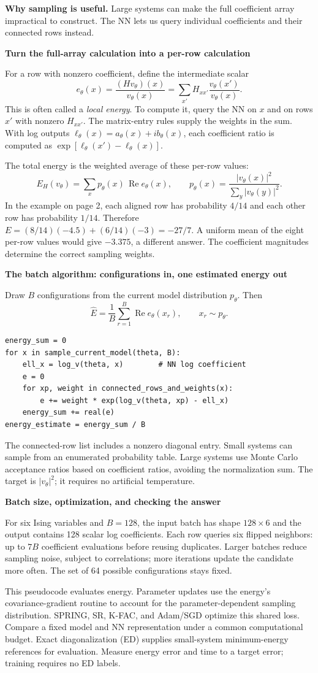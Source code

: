 \documentclass[11pt,letterpaper]{article}
\newcommand{\topic}[1]{\vspace{4pt}\textbf{\color{ink}#1}\par}
\newcommand{\Rea}{\operatorname{Re}}
\begin{document}
\textbf{Why sampling is useful.} Large systems can make the full coefficient array impractical to construct. The NN lets us query individual coefficients and their connected rows instead.

\topic{Turn the full-array calculation into a per-row calculation}
For a row with nonzero coefficient, define the intermediate scalar
\[
 e_\theta(x)=\frac{(Hv_\theta)(x)}{v_\theta(x)}
 =\sum_{x'}H_{xx'}\frac{v_\theta(x')}{v_\theta(x)}.
\]
This is often called a \emph{local energy}. To compute it, query the NN on $x$ and on rows $x'$ with nonzero $H_{xx'}$. The matrix-entry rules supply the weights in the sum. With log outputs $\ell_\theta(x)=a_\theta(x)+i b_\theta(x)$, each coefficient ratio is computed as $\exp[\ell_\theta(x')-\ell_\theta(x)]$.

The total energy is the weighted average of these per-row values:
\[
 E_H(v_\theta)=\sum_x p_\theta(x)\,\Rea e_\theta(x),\qquad
 p_\theta(x)=\frac{|v_\theta(x)|^2}{\sum_y|v_\theta(y)|^2}.
\]
In the example on page 2, each aligned row has probability $4/14$ and each other row has probability $1/14$. Therefore $E=(8/14)(-4.5)+(6/14)(-3)=-27/7$. A uniform mean of the eight per-row values would give $-3.375$, a different answer. The coefficient magnitudes determine the correct sampling weights.

\topic{The batch algorithm: configurations in, one estimated energy out}
Draw $B$ configurations from the current model distribution $p_\theta$. Then
\[
 \widehat E=\frac1B\sum_{r=1}^{B}\Rea e_\theta(x_r),
 \qquad x_r\sim p_\theta.
\]
{\small\begin{verbatim}
energy_sum = 0
for x in sample_current_model(theta, B):
    ell_x = log_v(theta, x)        # NN log coefficient
    e = 0
    for xp, weight in connected_rows_and_weights(x):
        e += weight * exp(log_v(theta, xp) - ell_x)
    energy_sum += real(e)
energy_estimate = energy_sum / B
\end{verbatim}}
The connected-row list includes a nonzero diagonal entry. Small systems can sample from an enumerated probability table. Large systems use Monte Carlo acceptance ratios based on coefficient ratios, avoiding the normalization sum. The target is $|v_\theta|^2$; it requires no artificial temperature.

\topic{Batch size, optimization, and checking the answer}
For six Ising variables and $B=128$, the input batch has shape $128\times6$ and the output contains 128 scalar log coefficients. Each row queries six flipped neighbors: up to $7B$ coefficient evaluations before reusing duplicates. Larger batches reduce sampling noise, subject to correlations; more iterations update the candidate more often. The set of 64 possible configurations stays fixed.

This pseudocode evaluates energy. Parameter updates use the energy's covariance-gradient routine to account for the parameter-dependent sampling distribution. SPRING, SR, K-FAC, and Adam/SGD optimize this shared loss. Compare a fixed model and NN representation under a common computational budget. Exact diagonalization (ED) supplies small-system minimum-energy references for evaluation. Measure energy error and time to a target error; training requires no ED labels.
\end{document}
